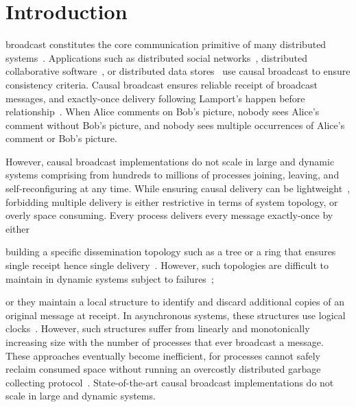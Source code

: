  
\section{Introduction}

 broadcast constitutes the core communication primitive
of many distributed systems~\cite{hadzilacos1994modular}. Applications such as
distributed social networks~\cite{borthakur2013petabyte}, distributed
collaborative software~\cite{heinrich2012exploiting,nedelec2016crate}, or
distributed data
stores~\cite{bailis2013bolton,bravo2017saturn,demers1987epidemic,lloyd2011cops,shapiro2011comprehensive}
use causal broadcast to ensure consistency criteria.  Causal broadcast ensures
reliable receipt of broadcast messages, and exactly-once delivery following
Lamport's happen before relationship~\cite{lamport1978time}. When Alice comments
on Bob's picture, nobody sees Alice's comment without Bob's picture, and nobody
sees multiple occurrences of Alice's comment or Bob's picture.

However, causal broadcast implementations do not scale in large and dynamic
systems comprising from hundreds to millions of processes joining, leaving, and
self-reconfiguring at any time. While ensuring causal delivery can be
lightweight~\cite{nedelec2018pcbroadcast}, forbidding multiple delivery is
either restrictive in terms of system topology, or overly space consuming. Every
process delivers every message exactly-once by either
\begin{inparaenum}[(i)]
\item building a specific dissemination topology such as a tree or a ring that
  ensures single receipt hence single
  delivery~\cite{bravo2017saturn,raynal2013distributed}. However, such
  topologies are difficult to maintain in dynamic systems subject to
  failures~\cite{krasikova2016hashtable};
\item or they maintain a local structure to identify and discard additional
  copies of an original message at receipt. In asynchronous systems, these
  structures use logical clocks~\cite{malkhi2007concise,mukund2014optimized}.
  However, such structures suffer from linearly and monotonically increasing
  size with the number of processes that ever broadcast a message.  These
  approaches eventually become inefficient, for processes cannot safely reclaim
  consumed space without running an overcostly distributed garbage collecting
  protocol~\cite{abdullahi1998garbage}. State-of-the-art causal broadcast
  implementations do not scale in large and dynamic systems.
\end{inparaenum}

